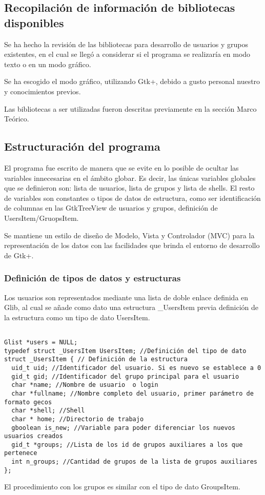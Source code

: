 \documentclass[letterpaper,10pt]{article}
\begin{document}
\subsection{Recopilación de información de bibliotecas disponibles}
Se ha hecho la revisión de las bibliotecas para desarrollo de usuarios y grupos existentes,
en el cual se llegó a considerar si el programa se realizaría en modo texto o en un modo gráfico.

Se ha escogido el modo gráfico, utilizando Gtk+, debido a gusto personal nuestro y conocimientos previos.

Las bibliotecas a ser utilizadas fueron descritas previamente en la sección Marco Teórico.

\subsection{Estructuración del programa}
El programa fue escrito de manera que se evite en lo posible de ocultar las variables innecesarias
en el ámbito globar. Es decir, las únicas variables globales que se definieron son: lista de usuarios,
lista de grupos y lista de shells.
El resto de variables son constantes o tipos de datos de estructura, como ser identificación de columnas en las GtkTreeView
de usuarios y grupos, definición de UsersItem/GruopsItem.

Se mantiene un estilo de diseño de Modelo, Vista y Controlador (MVC) para la representación de los datos
con las facilidades que brinda el entorno de desarrollo de Gtk+.

\subsubsection{Definición de tipos de datos y estructuras}
Los usuarios son representados mediante una lista de doble enlace definida en Glib, al cual se añade como 
dato una estructura \_UsersItem previa definición de la estructura como un tipo de dato UsersItem.

\begin{verbatim}

Glist *users = NULL;
typedef struct _UsersItem UsersItem; //Definición del tipo de dato
struct _UsersItem { // Definición de la estructura
  uid_t uid; //Identificador del usuario. Si es nuevo se establece a 0 
  gid_t gid; //Identificador del grupo principal para el usuario
  char *name; //Nombre de usuario  o login
  char *fullname; //Nombre completo del usuario, primer parámetro de formato gecos
  char *shell; //Shell
  char * home; //Directorio de trabajo 
  gboolean is_new; //Variable para poder diferenciar los nuevos usuarios creados 
  gid_t *groups; //Lista de los id de grupos auxiliares a los que pertenece
  int n_groups; //Cantidad de grupos de la lista de grupos auxiliares
};

\end{verbatim}
El procedimiento con los grupos es similar con el tipo de dato GroupsItem.
\end{document}
